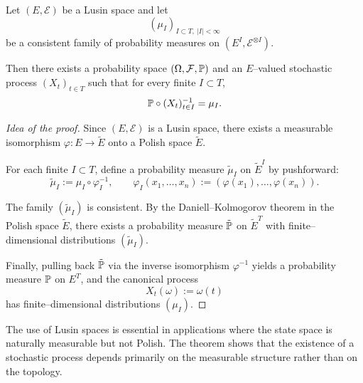 \begin{theorem}
Let $(E,\mathcal{E})$ be a Lusin space and let
\[
(\mu_I)_{I \subset T,\ |I|<\infty}
\]
be a consistent family of probability measures on $(E^I,\mathcal{E}^{\otimes I})$.

Then there exists a probability space $(\Omega,\mathcal{F},\mathbb{P})$ and an $E$--valued
stochastic process $(X_t)_{t\in T}$ such that for every finite $I \subset T$,
\[
\mathbb{P} \circ (X_t)_{t\in I}^{-1} = \mu_I.
\]
\end{theorem}

\begin{proof}[Idea of the proof]
Since $(E,\mathcal{E})$ is a Lusin space, there exists a measurable isomorphism
$\varphi : E \to \tilde E$ onto a Polish space $\tilde E$.

For each finite $I \subset T$, define a probability measure $\tilde\mu_I$ on
$\tilde E^I$ by pushforward:
\[
\tilde\mu_I := \mu_I \circ \varphi_I^{-1},
\qquad
\varphi_I(x_1,\dots,x_n) := (\varphi(x_1),\dots,\varphi(x_n)).
\]

The family $(\tilde\mu_I)$ is consistent.
By the Daniell--Kolmogorov theorem in the Polish space $\tilde E$, there exists a probability
measure $\tilde{\mathbb{P}}$ on $\tilde E^T$ with finite--dimensional distributions $(\tilde\mu_I)$.

Finally, pulling back $\tilde{\mathbb{P}}$ via the inverse isomorphism $\varphi^{-1}$ yields
a probability measure $\mathbb{P}$ on $E^T$, and the canonical process
\[
X_t(\omega) := \omega(t)
\]
has finite--dimensional distributions $(\mu_I)$.
\end{proof}

\begin{remark}
The use of Lusin spaces is essential in applications where the state space is naturally
measurable but not Polish. The theorem shows that the existence of a stochastic process
depends primarily on the measurable structure rather than on the topology.
\end{remark}

